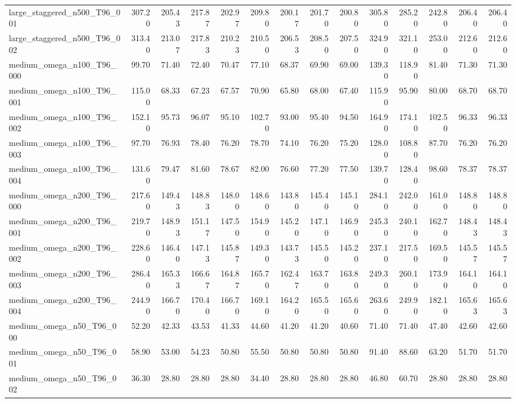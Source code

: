 \begin{table}[htbp]
\begin{tabular}{lrrrrrrrrrrrrr}
large\_staggered\_n500\_T96\_001 & 307.20 & 205.43 & 217.87 & 202.97 & 209.80 & 200.17 & 201.70 & 200.80 & 305.80 & 285.20 & 242.80 & 206.40 & 206.40 \\
large\_staggered\_n500\_T96\_002 & 313.40 & 213.07 & 217.83 & 210.23 & 210.50 & 206.53 & 208.50 & 207.50 & 324.90 & 321.10 & 253.00 & 212.60 & 212.60 \\
medium\_omega\_n100\_T96\_000 & 99.70 & 71.40 & 72.40 & 70.47 & 77.10 & 68.37 & 69.90 & 69.00 & 139.30 & 118.90 & 81.40 & 71.30 & 71.30 \\
medium\_omega\_n100\_T96\_001 & 115.00 & 68.33 & 67.23 & 67.57 & 70.90 & 65.80 & 68.00 & 67.40 & 115.90 & 95.90 & 80.00 & 68.70 & 68.70 \\
medium\_omega\_n100\_T96\_002 & 152.10 & 95.73 & 96.07 & 95.10 & 102.70 & 93.00 & 95.40 & 94.50 & 164.90 & 174.10 & 102.50 & 96.33 & 96.33 \\
medium\_omega\_n100\_T96\_003 & 97.70 & 76.93 & 78.40 & 76.20 & 78.70 & 74.10 & 76.20 & 75.20 & 128.00 & 108.80 & 87.70 & 76.20 & 76.20 \\
medium\_omega\_n100\_T96\_004 & 131.60 & 79.47 & 81.60 & 78.67 & 82.00 & 76.60 & 77.20 & 77.50 & 139.70 & 128.40 & 98.60 & 78.37 & 78.37 \\
medium\_omega\_n200\_T96\_000 & 217.60 & 149.43 & 148.83 & 148.00 & 148.60 & 143.80 & 145.40 & 145.10 & 284.10 & 242.00 & 161.00 & 148.80 & 148.80 \\
medium\_omega\_n200\_T96\_001 & 219.70 & 148.93 & 151.17 & 147.50 & 154.90 & 145.20 & 147.10 & 146.90 & 245.30 & 240.10 & 162.70 & 148.43 & 148.43 \\
medium\_omega\_n200\_T96\_002 & 228.60 & 146.40 & 147.13 & 145.87 & 149.30 & 143.73 & 145.50 & 145.20 & 237.10 & 217.50 & 169.50 & 145.57 & 145.57 \\
medium\_omega\_n200\_T96\_003 & 286.40 & 165.33 & 166.67 & 164.87 & 165.70 & 162.47 & 163.70 & 163.80 & 249.30 & 260.10 & 173.90 & 164.10 & 164.10 \\
medium\_omega\_n200\_T96\_004 & 244.90 & 166.70 & 170.40 & 166.70 & 169.10 & 164.20 & 165.50 & 165.60 & 263.60 & 249.90 & 182.10 & 165.63 & 165.63 \\
medium\_omega\_n50\_T96\_000 & 52.20 & 42.33 & 43.53 & 41.33 & 44.60 & 41.20 & 41.20 & 40.60 & 71.40 & 71.40 & 47.40 & 42.60 & 42.60 \\
medium\_omega\_n50\_T96\_001 & 58.90 & 53.00 & 54.23 & 50.80 & 55.50 & 50.80 & 50.80 & 50.80 & 91.40 & 88.60 & 63.20 & 51.70 & 51.70 \\
medium\_omega\_n50\_T96\_002 & 36.30 & 28.80 & 28.80 & 28.80 & 34.40 & 28.80 & 28.80 & 28.80 & 46.80 & 60.70 & 28.80 & 28.80 & 28.80 \\

\end{tabular}
\end{table}

